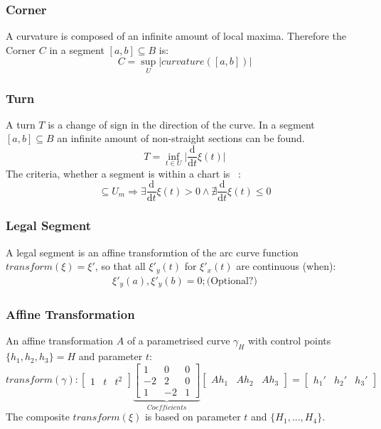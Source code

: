 \documentclass{article}
\begin{document}
\subsubsection{Corner}
A curvature is composed of an infinite amount of local maxima. Therefore the Corner $C$ in a segment $[a,b] \subseteq B$ is:
\begin{equation}
C = \sup_{U}\lvert curvature([a,b]) \rvert
\end{equation}

\subsubsection{Turn}
A turn $T$ is a change of sign in the direction of the curve. In a segment $[a,b] \subseteq B$ an infinite amount of non-straight sections can be found.
\begin{equation}
T = \inf_{t \in U} \lvert \frac{\mathrm{d}}{\mathrm{d}t}\xi(t) \rvert
\end{equation}
The criteria, whether a segment is within a chart is ~\cite[]{Loring}:
\begin{equation}
[a,b] \subseteq U_{m} \Rightarrow \exists  \frac{\mathrm{d}}{\mathrm{d}t}\xi(t)>0 \land \nexists \frac{\mathrm{d}}{\mathrm{d}t}\xi(t)\leq0
\end{equation}

\subsubsection{Legal Segment}
A legal segment is an affine transformtion of the arc curve function $transform(\xi) = \xi'$, so that all $\xi'_{y}(t)$ for $\xi'_{x}(t)$ are continuous (when):
\begin{align}
\xi'_{y}(a), \xi'_{y}(b) = 0; \text{(Optional?)}
\end{align}

\subsubsection{Affine Transformation}
An affine transformation $A$ of a parametrised curve $\gamma_{H}$ with control points $\{h_{1},h_{2},h_{3}\} = H$ and parameter $t$:
\begin{equation}
transform(\gamma):
\begin{bmatrix}
1 & t & t^2
\end{bmatrix}
\underbrace{\begin{bmatrix}
1 & 0 & 0\\
-2 & 2 & 0\\
1 & -2 &1
\end{bmatrix}}_{Coefficients}
\begin{bmatrix}
Ah_{1} & Ah_{2} & Ah_{3}
\end{bmatrix}
=
\begin{bmatrix}
h_{1}' & h_{2}' & h_{3}'
\end{bmatrix}
\end{equation}
The composite $transform(\xi)$ is based on parameter $t$ and $\{H_{1}, ... ,H_{4}\}$.
\end{document}
